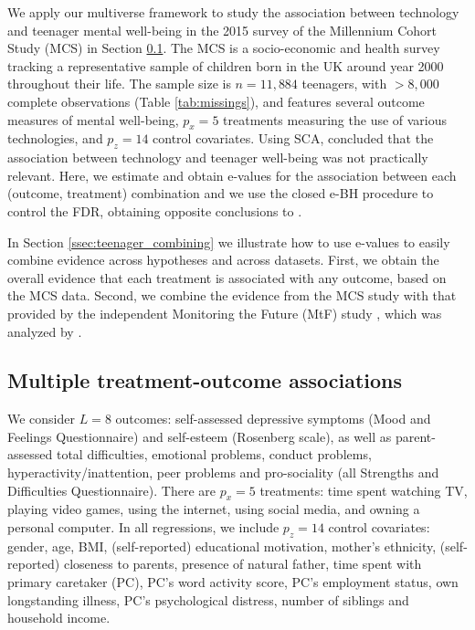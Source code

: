 \documentclass[pdflatex,sn-mathphys-num]{sn-jnl}%
\theoremstyle{thmstyleone}%
\theoremstyle{thmstyletwo}%
\theoremstyle{thmstylethree}%
\begin{document}
\color{black}
We apply our multiverse framework to study the association between technology and teenager mental well-being in the 2015 survey of the Millennium Cohort Study (MCS) \color{blue} in Section \ref{ssec:teenager_multiplicity}. \color{black} The MCS is a socio-economic and health survey tracking a representative sample of children born in the UK around year 2000 throughout their life. The sample size is $n = 11,884$ teenagers, \color{blue} with $>8,000$ complete observations (Table \ref{tab:missings}), \color{black} and features several outcome measures of mental well-being, $p_x=5$ treatments measuring the use of various technologies, and $p_z=14$ control covariates.
Using SCA, \cite{orben:2019} concluded that the association between technology and teenager well-being was not practically relevant. %
\color{blue}
Here, we estimate and obtain e-values for the association between each (outcome, treatment) combination
and we use the closed e-BH procedure to control the FDR,
obtaining opposite conclusions to \cite{orben:2019}.

In Section \ref{ssec:teenager_combining} we illustrate how to use e-values to easily combine evidence across hypotheses and across datasets.
First, we obtain the overall evidence that each treatment is associated with any outcome, based on the MCS data.
Second, we combine the evidence from the MCS study with that provided by the independent Monitoring the Future (MtF) study
\citep{mtfstudy:2025}, which was analyzed by \cite{twenge:2018}.
\color{black}


\subsection{Multiple treatment-outcome associations}
\label{ssec:teenager_multiplicity}


We consider $L=8$ outcomes: self-assessed depressive symptoms (Mood and Feelings Questionnaire) and self-esteem (Rosenberg scale), as well as parent-assessed total difficulties, emotional problems, conduct problems, hyperactivity/inattention, peer problems and pro-sociality (all Strengths and Difficulties Questionnaire). There are $p_x=5$ treatments: time spent watching TV, playing video games, using the internet, using social media, and owning a personal computer. 
In all regressions, we include $p_z=14$ control covariates: gender, age, BMI, (self-reported) educational motivation, mother’s ethnicity, 
(self-reported) closeness to parents, presence of natural father, time spent with primary
caretaker (PC), PC’s word activity score, PC’s employment status, own longstanding
illness, PC’s psychological distress, number of siblings and household income.
\end{document}
